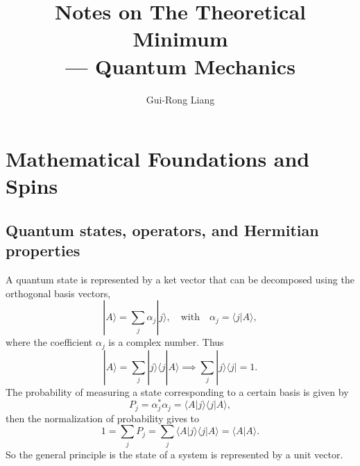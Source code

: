 \documentclass{article}
\title{Notes on The Theoretical Minimum\\
--- Quantum Mechanics}
\author{Gui-Rong Liang}
\newcommand{\be}{\begin{equation}}
\newcommand{\ee}{\end{equation}}
\newcommand{\1}{\left}
\newcommand{\2}{\right}
\newcommand{\br}{\langle}
\newcommand{\ke}{\rangle}
\newcommand{\al}{\alpha}
\begin{document}
\maketitle
\tableofcontents

\newpage

\section{Mathematical Foundations and Spins}
\subsection{Quantum states, operators, and Hermitian properties}
A quantum state is represented by a ket vector that can be decomposed using the orthogonal basis vectors,
\be
|A\ke=\sum_j \al_j|j\ke, \quad\text{with} \quad \al_j=\br j|A\ke,
\ee
where the coefficient $\al_j$ is a complex number. Thus
\be
|A\ke=\sum_j |j\ke \br j|A\ke \implies  \sum_j |j\ke \br j|=1.
\ee
The probability of measuring a state corresponding to a certain basis is given by
\be
P_j=\al_j^*\al_j=\br A |j\ke \br j|A\ke,
\ee
then the normalization of probability gives to 
\be
1=\sum_j P_j=\sum_j\br A |j\ke \br j|A\ke=\br A|A\ke.
\ee
So the general principle is the state of a system is represented by a unit vector.\\
\end{document}
